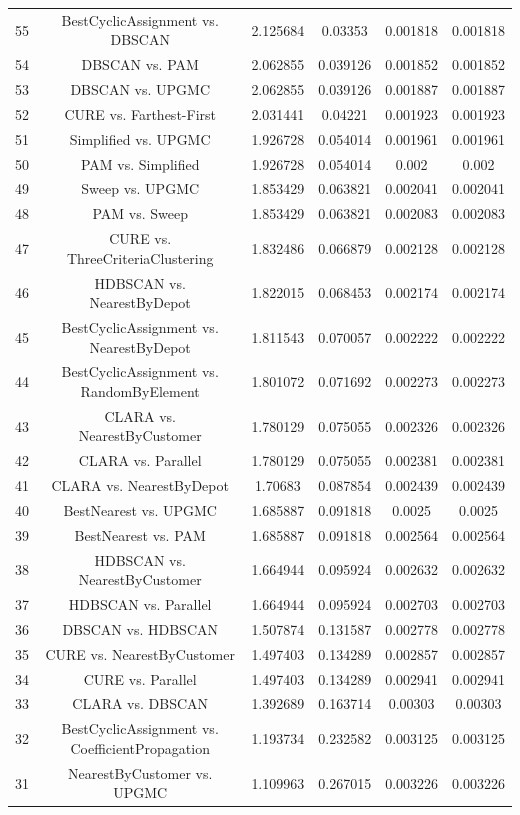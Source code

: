 \documentclass[a4paper,10pt]{article}
\begin{document}
\begin{landscape}
\begin{table}[!htp]
\begin{tabular}{cccccc}
55&BestCyclicAssignment vs. DBSCAN&2.125684&0.03353&0.001818&0.001818\\
54&DBSCAN vs. PAM&2.062855&0.039126&0.001852&0.001852\\
53&DBSCAN vs. UPGMC&2.062855&0.039126&0.001887&0.001887\\
52&CURE vs. Farthest-First&2.031441&0.04221&0.001923&0.001923\\
51&Simplified vs. UPGMC&1.926728&0.054014&0.001961&0.001961\\
50&PAM vs. Simplified&1.926728&0.054014&0.002&0.002\\
49&Sweep vs. UPGMC&1.853429&0.063821&0.002041&0.002041\\
48&PAM vs. Sweep&1.853429&0.063821&0.002083&0.002083\\
47&CURE vs. ThreeCriteriaClustering&1.832486&0.066879&0.002128&0.002128\\
46&HDBSCAN vs. NearestByDepot&1.822015&0.068453&0.002174&0.002174\\
45&BestCyclicAssignment vs. NearestByDepot&1.811543&0.070057&0.002222&0.002222\\
44&BestCyclicAssignment vs. RandomByElement&1.801072&0.071692&0.002273&0.002273\\
43&CLARA vs. NearestByCustomer&1.780129&0.075055&0.002326&0.002326\\
42&CLARA vs. Parallel&1.780129&0.075055&0.002381&0.002381\\
41&CLARA vs. NearestByDepot&1.70683&0.087854&0.002439&0.002439\\
40&BestNearest vs. UPGMC&1.685887&0.091818&0.0025&0.0025\\
39&BestNearest vs. PAM&1.685887&0.091818&0.002564&0.002564\\
38&HDBSCAN vs. NearestByCustomer&1.664944&0.095924&0.002632&0.002632\\
37&HDBSCAN vs. Parallel&1.664944&0.095924&0.002703&0.002703\\
36&DBSCAN vs. HDBSCAN&1.507874&0.131587&0.002778&0.002778\\
35&CURE vs. NearestByCustomer&1.497403&0.134289&0.002857&0.002857\\
34&CURE vs. Parallel&1.497403&0.134289&0.002941&0.002941\\
33&CLARA vs. DBSCAN&1.392689&0.163714&0.00303&0.00303\\
32&BestCyclicAssignment vs. CoefficientPropagation&1.193734&0.232582&0.003125&0.003125\\
31&NearestByCustomer vs. UPGMC&1.109963&0.267015&0.003226&0.003226\\

\end{tabular}
\end{table}
\end{landscape}
\end{document}
